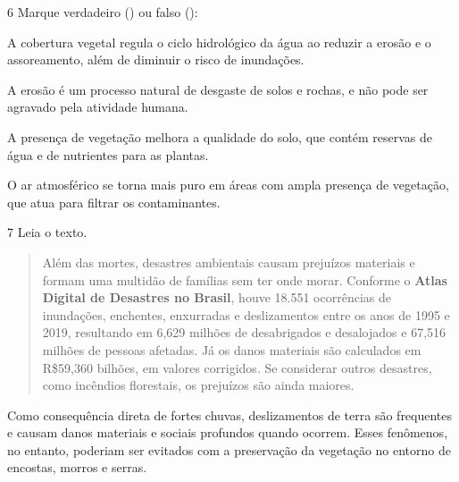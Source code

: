 \num{6} Marque verdadeiro () ou falso ():

\begin{boxlist}
 A cobertura vegetal regula o ciclo hidrológico da água ao reduzir 
a erosão e o assoreamento, além de diminuir o risco de inundações.

 A erosão é um processo natural de desgaste de solos e rochas, e 
não pode ser agravado pela atividade humana.

 A presença de vegetação melhora a qualidade do solo, que contém 
reservas de água e de nutrientes para as plantas.

 O ar atmosférico se torna mais puro em áreas com ampla presença de 
vegetação, que atua para filtrar os contaminantes.
\end{boxlist}


\num{7} Leia o texto.

\begin{quote}
Além das mortes, desastres ambientais causam prejuízos materiais e
formam uma multidão de famílias sem ter onde morar. Conforme o
\textbf{Atlas Digital de Desastres no Brasil}, houve 18.551 ocorrências
de inundações, enchentes, enxurradas e deslizamentos entre os anos de
1995 e 2019, resultando em 6,629 milhões de desabrigados e desalojados e
67,516 milhões de pessoas afetadas. Já os danos materiais são calculados
em R\$59,360 bilhões, em valores corrigidos. Se considerar outros
desastres, como incêndios florestais, os prejuízos são ainda maiores.

\end{quote}

Como consequência direta de fortes chuvas, deslizamentos de terra são
frequentes e causam danos materiais e sociais profundos quando ocorrem.
Esses fenômenos, no entanto, poderiam ser evitados com a preservação da
vegetação no entorno de encostas, morros e serras.

